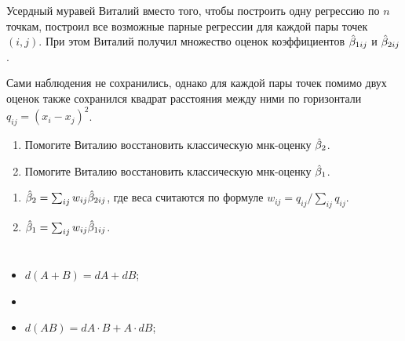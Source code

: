 \begin{problem}
Усердный муравей Виталий вместо того, чтобы построить одну регрессию по $n$ точкам,
построил все возможные парные регрессии для каждой пары точек $(i, j)$.
При этом Виталий получил множество оценок коэффициентов $\hat{\beta}_{1ij}$ и $\hat{\beta}_{2ij}$.

Сами наблюдения не сохранились, однако для каждой пары точек помимо двух оценок также сохранился квадрат расстояния между ними по горизонтали
$q_{ij} = (x_i - x_j)^2$.

\begin{enumerate}
  \item Помогите Виталию восстановить классическую мнк-оценку $\hat{\beta}_2$.
  \item Помогите Виталию восстановить классическую мнк-оценку $\hat{\beta}_1$.
\end{enumerate}
\begin{sol}
  \begin{enumerate}
    \item $\hat{\beta}_2 = \sum_{ij} w_{ij} \hat{\beta}_{2ij}$, где веса считаются по формуле $w_{ij} = q_{ij} / \sum_{ij} q_{ij}$.
    \item $\hat{\beta}_1 = \sum_{ij} w_{ij} \hat{\beta}_{1ij}$.
  \end{enumerate}  
\end{sol}
\end{problem}
  



\section{
}


\begin{leftbar}
\begin{itemize}
\item $d(A + B) = dA + dB$;
\item {}
\item $d(AB) = dA \cdot B + A \cdot dB$;
\end{itemize}

\end{leftbar}


